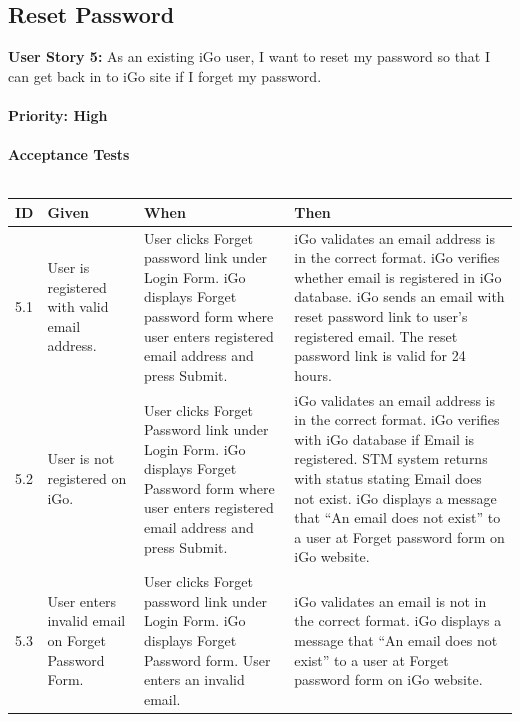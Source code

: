 \documentclass[11pt, english]{report}
\begin{document}
\subsection{Reset Password}
\textbf{User Story 5: }
As an existing iGo user, I want to reset my password so that I can get back in to iGo site if I forget my password.
\\ \\
\textbf{Priority: High}\\ \\
\textbf{Acceptance Tests}\\ \\
\setlength{\tabcolsep}{18pt}
\renewcommand{\arraystretch}{1.5}
\begin{longtable}{ |p{0.5cm}|p{3cm}|p{3.5cm}|p{5cm}| }
\hline
\textbf{ID} & \textbf{Given} & \textbf{When} & \textbf{Then}\\
\hline
5.1&
User is registered with valid email address.&
User clicks Forget password link under Login Form.
iGo displays Forget password form where user enters registered email address and press Submit.&
iGo validates an email address is in the correct format.
iGo verifies whether email is registered in iGo database.
iGo sends an email with reset password link to user’s registered email. The reset password link is valid for 24 hours.
 \\
\hline
5.2&
User is not registered on iGo.&
User clicks Forget Password link under Login Form.
iGo displays Forget Password form where user enters registered email address and press Submit.&
iGo validates an email address is in the correct format.
iGo verifies with iGo database if Email is registered.
STM system returns with status stating Email does not exist.
iGo displays a message that “An email does not exist” to a user at Forget password form on iGo website.
 \\
\hline

5.3&
User enters invalid email on Forget Password Form.&
User clicks Forget password link under Login Form.
iGo displays Forget Password form.
User enters an invalid email.&
iGo validates an email is not in the correct format.
iGo displays a message that “An email does not exist” to a user at Forget password form on iGo website.
\\
\hline
\end{longtable}
\end{document}
